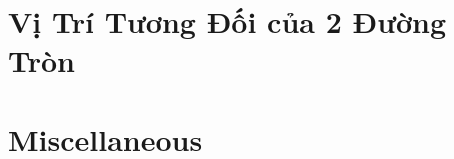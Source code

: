 \documentclass{article}
\begin{document}

\section{Vị Trí Tương Đối của 2 Đường Tròn}


\section{Miscellaneous}


\printbibliography[heading=bibintoc]
	
\end{document}
